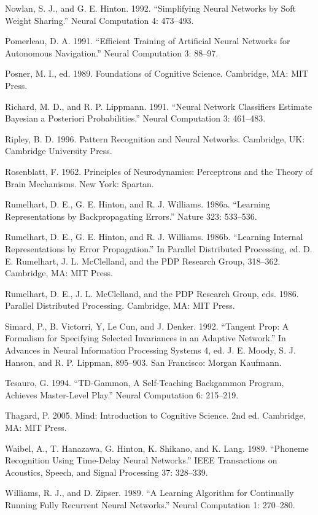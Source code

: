 Nowlan, S. J., and G. E. Hinton. 1992. “Simplifying Neural Networks by Soft Weight Sharing.” Neural Computation 4: 473--493.

Pomerleau, D. A. 1991. “Efficient Training of Artificial Neural Networks for Autonomous Navigation.” Neural Computation 3: 88--97.

Posner, M. I., ed. 1989. Foundations of Cognitive Science. Cambridge, MA: MIT Press.

Richard, M. D., and R. P. Lippmann. 1991. “Neural Network Classifiers Estimate Bayesian a Posteriori Probabilities.” Neural Computation 3: 461--483.

Ripley, B. D. 1996. Pattern Recognition and Neural Networks. Cambridge, UK: Cambridge University Press.

Rosenblatt, F. 1962. Principles of Neurodynamics: Perceptrons and the Theory of Brain Mechanisms. New York: Spartan.

Rumelhart, D. E., G. E. Hinton, and R. J. Williams. 1986a. “Learning Representations by Backpropagating Errors.” Nature 323: 533--536.

Rumelhart, D. E., G. E. Hinton, and R. J. Williams. 1986b. “Learning Internal Representations by Error Propagation.” In Parallel Distributed Processing, ed. D. E. Rumelhart, J. L. McClelland, and the PDP Research Group, 318--362. Cambridge, MA: MIT Press.

Rumelhart, D. E., J. L. McClelland, and the PDP Research Group, eds. 1986. Parallel Distributed Processing. Cambridge, MA: MIT Press.

Simard, P., B. Victorri, Y, Le Cun, and J. Denker. 1992. “Tangent Prop: A Formalism for Specifying Selected Invariances in an Adaptive Network.” In Advances in Neural Information Processing Systems 4, ed. J. E. Moody, S. J. Hanson, and R. P. Lippman, 895--903. San Francisco: Morgan Kaufmann.

Tesauro, G. 1994. “TD-Gammon, A Self-Teaching Backgammon Program, Achieves Master-Level Play.” Neural Computation 6: 215--219.

Thagard, P. 2005. Mind: Introduction to Cognitive Science. 2nd ed. Cambridge, MA: MIT Press.

Waibel, A., T. Hanazawa, G. Hinton, K. Shikano, and K. Lang. 1989. “Phoneme Recognition Using Time-Delay Neural Networks.” IEEE Transactions on Acoustics, Speech, and Signal Processing 37: 328--339.

Williams, R. J., and D. Zipser. 1989. “A Learning Algorithm for Continually Running Fully Recurrent Neural Networks.” Neural Computation 1: 270--280.
